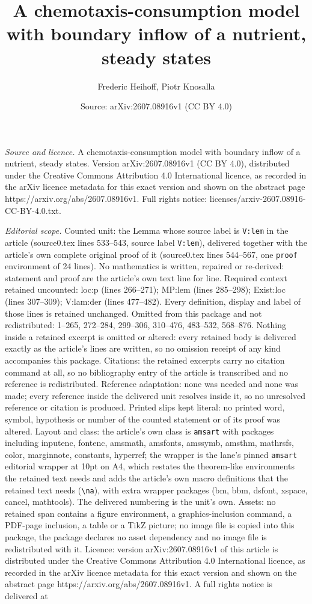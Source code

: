 \documentclass[10pt,a4paper]{amsart}
\title[A chemotaxis-consumption model with boundary inflow of a nut]{A chemotaxis-consumption model with boundary inflow of a nutrient, steady states}
\author{Frederic Heihoff, Piotr Knosalla}
\date{Source: arXiv:2607.08916v1 (CC BY 4.0)}
\begin{document}
\maketitle

\noindent\emph{Source and licence.} A chemotaxis-consumption model with boundary inflow of a nutrient, steady states. Version arXiv:2607.08916v1 (CC BY 4.0), distributed under the Creative Commons Attribution 4.0 International licence, as recorded in the arXiv licence metadata for this exact version and shown on the abstract page https://arxiv.org/abs/2607.08916v1. Full rights notice: licenses/arxiv-2607.08916-CC-BY-4.0.txt.\par\smallskip

\noindent\textit{Editorial scope.} Counted unit: the Lemma whose source label is \texttt{V:lem} in the article (source0.tex lines 533--543, source label \texttt{V:lem}), delivered together with the article's own complete original proof of it (source0.tex lines 544--567, one \texttt{proof} environment of 24 lines). No mathematics is written, repaired or re-derived: statement and proof are the article's own text line for line. Required context retained uncounted: loc:p (lines 266--271); MP:lem (lines 285--298); Exist:loc (lines 307--309); V:lam:der (lines 477--482). Every definition, display and label of those lines is retained unchanged. Omitted from this package and not redistributed: 1--265, 272--284, 299--306, 310--476, 483--532, 568--876. Nothing inside a retained excerpt is omitted or altered: every retained body is delivered exactly as the article's lines are written, so no omission receipt of any kind accompanies this package. Citations: the retained excerpts carry no citation command at all, so no bibliography entry of the article is transcribed and no reference is redistributed. Reference adaptation: none was needed and none was made; every reference inside the delivered unit resolves inside it, so no unresolved reference or citation is produced. Printed slips kept literal: no printed word, symbol, hypothesis or number of the counted statement or of its proof was altered. Layout and class: the article's own class is \texttt{amsart} with packages including inputenc, fontenc, amsmath, amsfonts, amssymb, amsthm, mathrsfs, color, marginnote, constants, hyperref; the wrapper is the lane's pinned \texttt{amsart} editorial wrapper at 10pt on A4, which restates the theorem-like environments the retained text needs and adds the article's own macro definitions that the retained text needs (\texttt{\textbackslash na}), with extra wrapper packages (bm, bbm, dsfont, xspace, cancel, mathtools). The delivered numbering is the unit's own. Assets: no retained span contains a figure environment, a graphics-inclusion command, a PDF-page inclusion, a table or a TikZ picture; no image file is copied into this package, the package declares no asset dependency and no image file is redistributed with it. Licence: version arXiv:2607.08916v1 of this article is distributed under the Creative Commons Attribution 4.0 International licence, as recorded in the arXiv licence metadata for this exact version and shown on the abstract page https://arxiv.org/abs/2607.08916v1. A full rights notice is delivered at 
\end{document}
